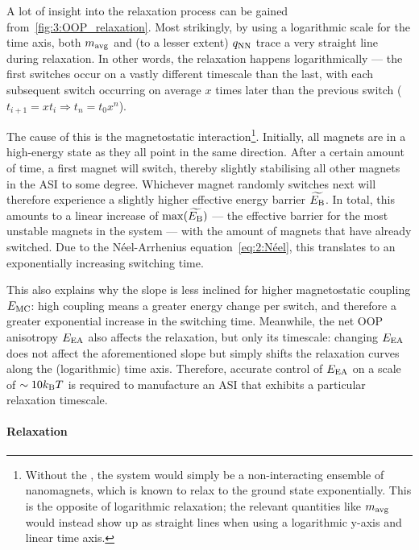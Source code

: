 A lot of insight into the relaxation process can be gained from~\cref{fig:3:OOP_relaxation}.
Most strikingly, by using a logarithmic scale for the time axis, both $m_\mathrm{avg}$ and (to a lesser extent) $q_\mathrm{NN}$ trace a very straight line during relaxation.
In other words, the relaxation happens logarithmically --- the first switches occur on a vastly different timescale than the last, with each subsequent switch occurring on average $x$ times later than the previous switch ($t_{i+1} = x t_i \Rightarrow t_n = t_0 x^n$). \par
The cause of this is the magnetostatic interaction\footnote{
	Without the , the system would simply be a non-interacting ensemble of nanomagnets, which is known to relax to the ground state exponentially.
	This is the opposite of logarithmic relaxation; the relevant quantities like $m_\mathrm{avg}$ would instead show up as straight lines when using a logarithmic y-axis and linear time axis.
}.
Initially, all magnets are in a high-energy state as they all point in the same direction.
After a certain amount of time, a first magnet will switch, thereby slightly stabilising all other magnets in the ASI to some degree.
Whichever magnet randomly switches next will therefore experience a slightly higher effective energy barrier $\widetilde{E_\mathrm{B}}$.
In total, this amounts to a linear increase of $\max(\widetilde{E_\mathrm{B}})$ --- the effective barrier for the most unstable magnets in the system --- with the amount of magnets that have already switched.
Due to the N\'eel-Arrhenius equation~\eqref{eq:2:Néel}, this translates to an exponentially increasing switching time. \par
This also explains why the slope is less inclined for higher magnetostatic coupling $E_\mathrm{MC}$: high coupling means a greater energy change per switch, and therefore a greater exponential increase in the switching time.
Meanwhile, the net OOP anisotropy $E_\mathrm{EA}$ also affects the relaxation, but only its timescale: changing $E_\mathrm{EA}$ does not affect the aforementioned slope but simply shifts the relaxation curves along the (logarithmic) time axis.
Therefore, accurate control of $E_\mathrm{EA}$ on a scale of $\sim 10\kBT$ is required to manufacture an ASI that exhibits a particular relaxation timescale. \par


\paragraph{Relaxation}
